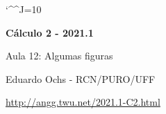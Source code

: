 \documentclass[oneside,12pt]{article}
\begin{document}
\catcode`\^^J=10

\pu

%
%

\def\drafturl{http://angg.twu.net/LATEX/2021-1-C2.pdf}
\def\drafturl{http://angg.twu.net/2021.1-C2.html}
\def\draftfooter{\tiny \href{\drafturl}{\jobname{}} \ColorBrown{\shorttoday{} \hours}}



%

\thispagestyle{empty}

\begin{center}

\vspace*{1.2cm}

{\bf \Large Cálculo 2 - 2021.1}

\bsk

Aula 12: Algumas figuras

\bsk

Eduardo Ochs - RCN/PURO/UFF

\url{http://angg.twu.net/2021.1-C2.html}

\end{center}

\newpage
\end{document}
